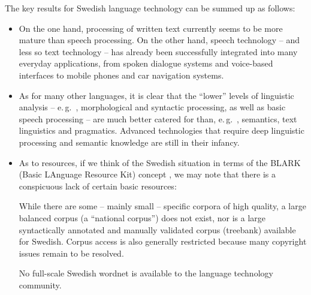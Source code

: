 \begin{multicols}{2}
The key results for Swedish language technology can be summed up as follows:

\begin{itemize}
\item On the one hand, processing of written text currently seems to
  be more mature than speech processing. On the other hand, speech
  technology -- and less so text technology -- has already been
  successfully integrated into many everyday applications, from spoken
  dialogue systems and voice-based interfaces to mobile phones and car
  navigation systems.
\item As for many other languages, it is clear that the ``lower''
  levels of linguistic analysis -- e.\,g.~, morphological and syntactic
  processing, as well as basic speech processing -- are much better
  catered for than, e.\,g.~, semantics, text linguistics and
  pragmatics. Advanced technologies that require deep linguistic
  processing and semantic knowledge are still in their infancy.
\item As to resources, if we think of the Swedish situation in terms
  of the BLARK (Basic LAnguage Resource Kit) concept \cite{blark}, we
  may note that there is a conspicuous lack of certain basic
  resources:

While there are some -- mainly small -- specific corpora of high
  quality, a large balanced corpus (a ``national corpus'') does not
  exist, nor is a large syntactically annotated and manually validated
  corpus (treebank) available for Swedish. Corpus access is also
  generally restricted because many copyright issues remain to be
  resolved.

No full-scale Swedish wordnet is available to the language
  technology community.


\end{itemize}
\end{multicols}
